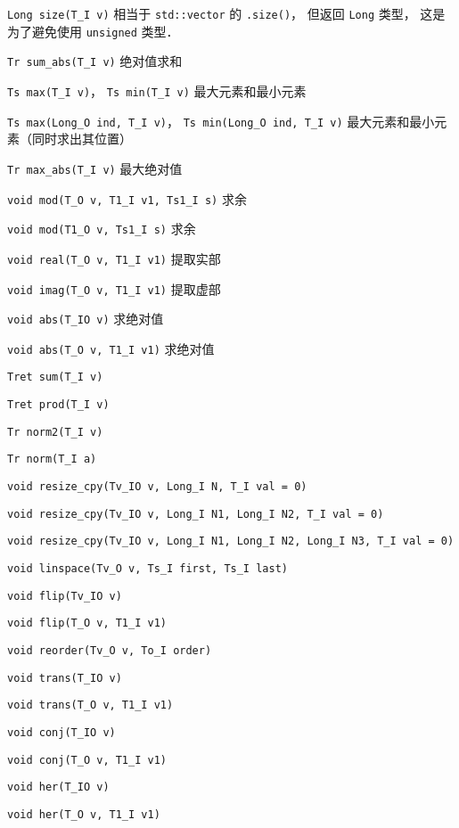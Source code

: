
\begin{issues}
\issueDraft
\end{issues}

\verb|Long size(T_I v)| 相当于 \verb|std::vector| 的 \verb|.size()|， 但返回 \verb|Long| 类型， 这是为了避免使用 \verb|unsigned| 类型．

\verb|Tr sum_abs(T_I v)| 绝对值求和

\verb|Ts max(T_I v)|， \verb|Ts min(T_I v)| 最大元素和最小元素

\verb|Ts max(Long_O ind, T_I v)|， \verb|Ts min(Long_O ind, T_I v)| 最大元素和最小元素（同时求出其位置）

\verb|Tr max_abs(T_I v)| 最大绝对值

\verb|void mod(T_O v, T1_I v1, Ts1_I s)| 求余

\verb|void mod(T1_O v, Ts1_I s)| 求余

\verb|void real(T_O v, T1_I v1)| 提取实部

\verb|void imag(T_O v, T1_I v1)| 提取虚部

\verb|void abs(T_IO v)| 求绝对值

\verb|void abs(T_O v, T1_I v1)| 求绝对值

\verb|Tret sum(T_I v)|

\verb|Tret prod(T_I v)|

\verb|Tr norm2(T_I v)|

\verb|Tr norm(T_I a)|

\verb|void resize_cpy(Tv_IO v, Long_I N, T_I val = 0)|

\verb|void resize_cpy(Tv_IO v, Long_I N1, Long_I N2, T_I val = 0)|

\verb|void resize_cpy(Tv_IO v, Long_I N1, Long_I N2, Long_I N3, T_I val = 0)|

\verb|void linspace(Tv_O v, Ts_I first, Ts_I last)|

\verb|void flip(Tv_IO v)|

\verb|void flip(T_O v, T1_I v1)|

\verb|void reorder(Tv_O v, To_I order)|

\verb|void trans(T_IO v)|

\verb|void trans(T_O v, T1_I v1)|

\verb|void conj(T_IO v)|

\verb|void conj(T_O v, T1_I v1)|

\verb|void her(T_IO v)|

\verb|void her(T_O v, T1_I v1)|

